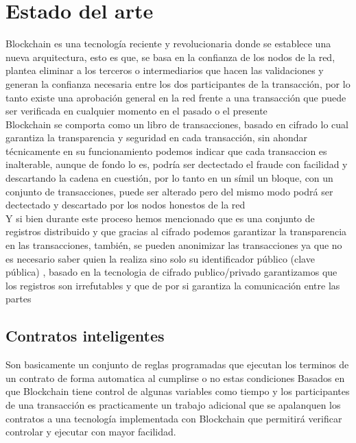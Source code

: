 \section{Estado del arte}
Blockchain es una tecnología reciente y revolucionaria donde se establece una nueva arquitectura\citep{iansiti2017truth}, esto es que, se basa en la confianza de los nodos de la red, plantea eliminar a los terceros o intermediarios que hacen las validaciones y generan la confianza necesaria entre los dos participantes de la transacción, por lo tanto existe una aprobación general en la red frente a una transacción  que puede ser verificada en cualquier momento en el pasado o el presente \citep{crosby2016blockchain}
\\
Blockchain se comporta como un libro de transacciones, basado en cifrado lo cual garantiza la transparencia y seguridad en cada transacción, sin ahondar técnicamente en su funcionamiento podemos indicar que cada transaccion es inalterable, aunque de fondo lo es, podría ser dectectado el fraude con facilidad y descartando la cadena en cuestión, por lo tanto en un símil un bloque, con un conjunto de transacciones, puede ser alterado pero del mismo modo podrá ser dectectado y descartado por los nodos honestos de la red \citep{nakamoto2009bitcoin}
\\
Y si bien durante este proceso hemos mencionado que es una conjunto de registros distribuido y que gracias al cifrado podemos garantizar la transparencia en las transacciones, también, se pueden anonimizar las transacciones ya que no es necesario saber quien la realiza sino solo su identificador público (clave pública) \citep{crosby2016blockchain}, basado en la tecnologia de cifrado publico/privado garantizamos que los registros son irrefutables \citep{banafa2017Blockchain} y que de por si garantiza la comunicación entre las partes \citep{iansiti2017truth}


\subsection{Contratos inteligentes}
Son basicamente un conjunto de reglas programadas que ejecutan los terminos de un contrato de forma automatica al cumplirse o no estas condiciones \citep{crosby2016blockchain}
Basados en que Blockchain  tiene control de algunas variables como tiempo \citep{kosba2016hawk} y los participantes de una transacción es practicamente un trabajo adicional que se apalanquen los contratos a una tecnología implementada con Blockchain que permitirá verificar controlar y ejecutar con mayor facilidad.

